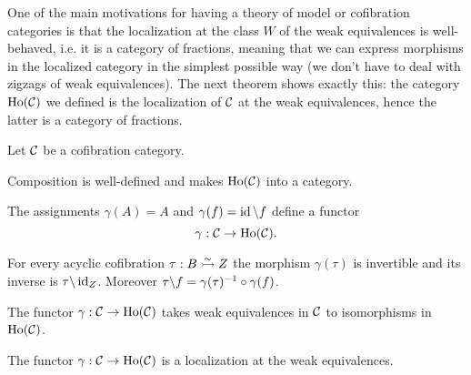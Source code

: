 One of the main motivations for having a theory of model or cofibration categories is that the localization at the class $W$ of the weak equivalences is well-behaved, i.e. it is a category of fractions, meaning that we can express morphisms in the localized category in the simplest possible way (we don't have to deal with zigzags of weak equivalences). The next theorem shows exactly this: the category $\operatorname{Ho}(\mathcal{C})$ we defined is the localization of $\mathcal{C}$ at the weak equivalences, hence the latter is a category of fractions.

\begin{theorem}\label{theorem:homotopy-category-is-localization}
Let $\mathcal{C}$ be a cofibration category.
\begin{rmnumerate}
    \item Composition is well-defined and makes $\operatorname{Ho}(\mathcal{C})$ into a category.
    \item The assignments $\gamma(A)=A$ and $\gamma(f)=\operatorname{id}\backslash f$ define a functor
    \[\gamma:\mathcal{C}\to\operatorname{Ho}(\mathcal{C}).\]
    \item For every acyclic cofibration $\tau:B\acco Z$ the morphism $\gamma(\tau)$ is invertible and its inverse is $\tau\backslash\operatorname{id}_Z$. Moreover $\tau\backslash f=\gamma(\tau)^{-1}\circ\gamma(f)$.
    \item The functor $\gamma:\mathcal{C}\to\operatorname{Ho}(\mathcal{C})$ takes weak equivalences in $\mathcal{C}$ to isomorphisms in $\operatorname{Ho}(\mathcal{C})$.
    \item The functor $\gamma:\mathcal{C}\to\operatorname{Ho}(\mathcal{C})$ is a localization at the weak equivalences.
\end{rmnumerate}
\end{theorem}

